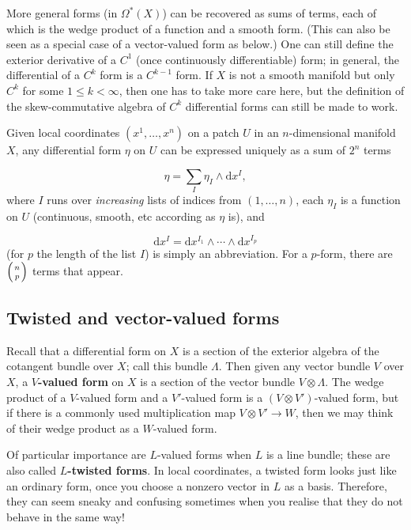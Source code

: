 \documentclass[preprint, 5p, 10pt]{elsarticle}
\theoremstyle{plain}
\newcommand{\lt}{<}
\begin{document}
More general forms (in $\Omega^*(X)$) can be recovered as sums of terms, each of which is the wedge product of a function and a smooth form. (This can also be seen as a special case of a vector-valued form as below.) One can still define the exterior derivative of a $C^1$ (once continuously differentiable) form; in general, the differential of a $C^k$ form is a $C^{k-1}$ form. If $X$ is not a smooth manifold but only $C^k$ for some $1 \leq k \lt \infty$, then one has to take more care here, but the definition of the skew-commutative algebra of $C^k$ differential forms can still be made to work.

Given local coordinates $(x^1, \ldots, x^n)$ on a patch $U$ in an $n$-dimensional manifold $X$, any differential form $\eta$ on $U$ can be expressed uniquely as a sum of $2^n$ terms

\begin{displaymath}
\eta = \sum_I \eta_I \wedge \mathrm{d}x^I ,
\end{displaymath}
where $I$ runs over \emph{increasing} lists of indices from $(1,\ldots,n)$, each $\eta_I$ is a function on $U$ (continuous, smooth, etc according as $\eta$ is), and

\begin{displaymath}
\mathrm{d}x^I = \mathrm{d}x^{I_1} \wedge \cdots \wedge \mathrm{d}x^{I_p}
\end{displaymath}
(for $p$ the length of the list $I$) is simply an abbreviation. For a $p$-form, there are $\left(n \atop p\right)$ terms that appear.

\subsection*{{Twisted and vector-valued forms}}\label{twisted_and_vectorvalued_forms_6}

Recall that a differential form on $X$ is a section of the exterior algebra of the cotangent bundle over $X$; call this bundle $\Lambda$. Then given any vector bundle $V$ over $X$, a \textbf{$V$-valued form} on $X$ is a section of the vector bundle $V \otimes \Lambda$. The wedge product of a $V$-valued form and a $V'$-valued form is a $(V \otimes V')$-valued form, but if there is a commonly used multiplication map $V \otimes V' \to W$, then we may think of their wedge product as a $W$-valued form.

Of particular importance are $L$-valued forms when $L$ is a line bundle; these are also called \textbf{$L$-twisted forms}. In local coordinates, a twisted form looks just like an ordinary form, once you choose a nonzero vector in $L$ as a basis. Therefore, they can seem sneaky and confusing sometimes when you realise that they do not behave in the same way!
\end{document}
